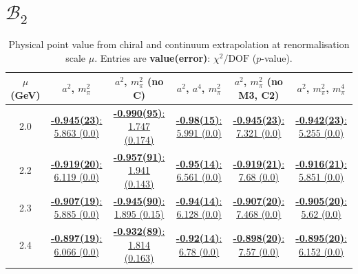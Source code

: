 \documentclass[12pt]{extarticle}
\begin{document}
\section{$\mathcal{B}_2$}
\begin{table}[h!]
\begin{center}
\begin{tabular}{|c|c|c|c|c|c|}
\hline
$\mu$ (GeV) & $a^2$, $m_\pi^2$& $a^2$, $m_\pi^2$ (no C)& $a^2$, $a^4$, $m_\pi^2$& $a^2$, $m_\pi^2$ (no M3, C2)& $a^2$, $m_\pi^2$, $m_\pi^4$\\
\hline
2.0& \hyperlink{VVmAA/SUSY/a2m2_20.pdf.1}{\textbf{-0.945(23)}: 5.863 (0.0)} & \hyperlink{VVmAA/SUSY/a2m2noC_20.pdf.1}{\textbf{-0.990(95)}: 1.747 (0.174)} & \hyperlink{VVmAA/SUSY/a2a4m2_20.pdf.1}{\textbf{-0.98(15)}: 5.991 (0.0)} & \hyperlink{VVmAA/SUSY/a2m2mcut_20.pdf.1}{\textbf{-0.945(23)}: 7.321 (0.0)} & \hyperlink{VVmAA/SUSY/a2m2m4_20.pdf.1}{\textbf{-0.942(23)}: 5.255 (0.0)}\\
2.2& \hyperlink{VVmAA/SUSY/a2m2_22.pdf.1}{\textbf{-0.919(20)}: 6.119 (0.0)} & \hyperlink{VVmAA/SUSY/a2m2noC_22.pdf.1}{\textbf{-0.957(91)}: 1.941 (0.143)} & \hyperlink{VVmAA/SUSY/a2a4m2_22.pdf.1}{\textbf{-0.95(14)}: 6.561 (0.0)} & \hyperlink{VVmAA/SUSY/a2m2mcut_22.pdf.1}{\textbf{-0.919(21)}: 7.68 (0.0)} & \hyperlink{VVmAA/SUSY/a2m2m4_22.pdf.1}{\textbf{-0.916(21)}: 5.851 (0.0)}\\
2.3& \hyperlink{VVmAA/SUSY/a2m2_23.pdf.1}{\textbf{-0.907(19)}: 5.885 (0.0)} & \hyperlink{VVmAA/SUSY/a2m2noC_23.pdf.1}{\textbf{-0.945(90)}: 1.895 (0.15)} & \hyperlink{VVmAA/SUSY/a2a4m2_23.pdf.1}{\textbf{-0.94(14)}: 6.128 (0.0)} & \hyperlink{VVmAA/SUSY/a2m2mcut_23.pdf.1}{\textbf{-0.907(20)}: 7.468 (0.0)} & \hyperlink{VVmAA/SUSY/a2m2m4_23.pdf.1}{\textbf{-0.905(20)}: 5.62 (0.0)}\\
2.4& \hyperlink{VVmAA/SUSY/a2m2_24.pdf.1}{\textbf{-0.897(19)}: 6.066 (0.0)} & \hyperlink{VVmAA/SUSY/a2m2noC_24.pdf.1}{\textbf{-0.932(89)}: 1.814 (0.163)} & \hyperlink{VVmAA/SUSY/a2a4m2_24.pdf.1}{\textbf{-0.92(14)}: 6.78 (0.0)} & \hyperlink{VVmAA/SUSY/a2m2mcut_24.pdf.1}{\textbf{-0.898(20)}: 7.57 (0.0)} & \hyperlink{VVmAA/SUSY/a2m2m4_24.pdf.1}{\textbf{-0.895(20)}: 6.152 (0.0)}\\
\hline
\end{tabular}
\caption{Physical point value from chiral and continuum extrapolation at renormalisation scale $\mu$. Entries are \textbf{value(error)}: $\chi^2/\text{DOF}$ ($p$-value).}
\end{center}
\end{table}
\end{document}
